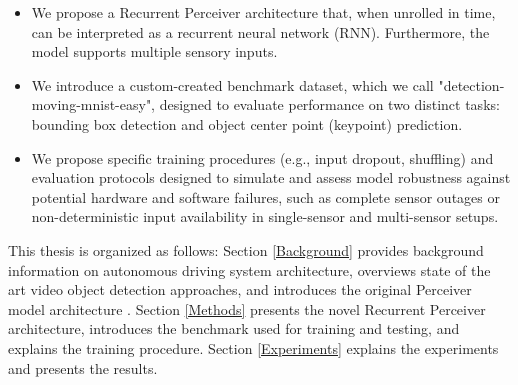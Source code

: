 \begin{itemize}
    \item We propose a Recurrent Perceiver architecture that, when unrolled in time, can be interpreted as a recurrent neural network (RNN). Furthermore, the model supports multiple sensory inputs.
    \item We introduce a custom-created benchmark dataset, which we call "detection-moving-mnist-easy", designed to evaluate performance on two distinct tasks: bounding box detection and object center point (keypoint) prediction.    
    \item We propose specific training procedures (e.g., input dropout, shuffling) and evaluation protocols designed to simulate and assess model robustness against potential hardware and software failures, such as complete sensor outages or non-deterministic input availability in single-sensor and multi-sensor setups.
\end{itemize}

This thesis is organized as follows: Section \ref{Background} provides background information on autonomous driving system architecture, overviews state of the art video object detection approaches, and introduces the original Perceiver model architecture \cite{jaeglePerceiverGeneralPerception2021}. Section \ref{Methods} presents the novel Recurrent Perceiver architecture, introduces the benchmark used for training and testing, and explains the training procedure. Section \ref{Experiments} explains the experiments and presents the results.



